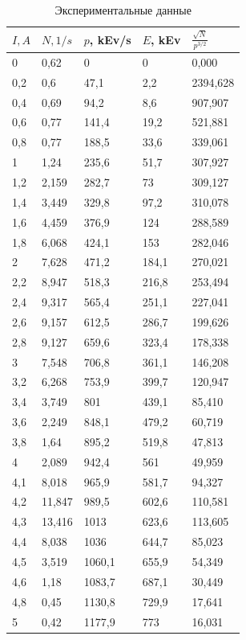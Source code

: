 \documentclass[a4paper]{article}
\begin{document}
\begin{enumerate}
    \begin{table}[h]
    \centering
    \begin{center}
    \caption{Экспериментальные данные}
    \end{center}
    \vspace{0.1cm}
    \label{tab:my_label}
    \begin{tabular}{|p{1.5cm}|p{1.5cm}|p{1.5cm}|p{1.5cm}|p{1.5cm}|}
    \hline
    $I, A$    & $N, 1/s$   & $p$, kEv/s      & $E$, kEv      & $\frac{\sqrt{N}}{p^{3/2}}$ \\
\hline
0 & 0,62 & 0 & 0 & 0,000\\
\hline
0,2 & 0,6 & 47,1 & 2,2 & 2394,628\\
\hline
0,4 & 0,69 & 94,2 & 8,6 & 907,907\\
\hline
0,6 & 0,77 & 141,4 & 19,2 & 521,881\\
\hline
0,8 & 0,77 & 188,5 & 33,6 & 339,061\\
\hline
1 & 1,24 & 235,6 & 51,7 & 307,927\\
\hline
1,2 & 2,159 & 282,7 & 73 & 309,127\\
\hline
1,4 & 3,449 & 329,8 & 97,2 & 310,078\\
\hline
1,6 & 4,459 & 376,9 & 124 & 288,589\\
\hline
1,8 & 6,068 & 424,1 & 153 & 282,046\\
\hline
2 & 7,628 & 471,2 & 184,1 & 270,021\\
\hline
2,2 & 8,947 & 518,3 & 216,8 & 253,494\\
\hline
2,4 & 9,317 & 565,4 & 251,1 & 227,041\\
\hline
2,6 & 9,157 & 612,5 & 286,7 & 199,626\\
\hline
2,8 & 9,127 & 659,6 & 323,4 & 178,338\\
\hline
3 & 7,548 & 706,8 & 361,1 & 146,208\\
\hline
3,2 & 6,268 & 753,9 & 399,7 & 120,947\\
\hline
3,4 & 3,749 & 801 & 439,1 & 85,410\\
\hline
3,6 & 2,249 & 848,1 & 479,2 & 60,719\\
\hline
3,8 & 1,64 & 895,2 & 519,8 & 47,813\\
\hline
4 & 2,089 & 942,4 & 561 & 49,959\\
\hline
4,1 & 8,018 & 965,9 & 581,7 & 94,327\\
\hline
4,2 & 11,847 & 989,5 & 602,6 & 110,581\\
\hline
4,3 & 13,416 & 1013 & 623,6 & 113,605\\
\hline
4,4 & 8,038 & 1036 & 644,7 & 85,023\\
\hline
4,5 & 3,519 & 1060,1 & 655,9 & 54,349\\
\hline
4,6 & 1,18 & 1083,7 & 687,1 & 30,449\\
\hline
4,8 & 0,45 & 1130,8 & 729,9 & 17,641\\
\hline
5 & 0,42 & 1177,9 & 773 & 16,031\\
\hline
 \end{tabular}
\end{table} 


\end{enumerate}
\end{document}
